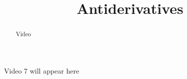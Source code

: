 \documentclass[handout]{ximera}
\title{Antiderivatives}
\begin{document}
\begin{abstract} Video %
\end{abstract}

\maketitle

Video 7 will appear here
\end{document}
